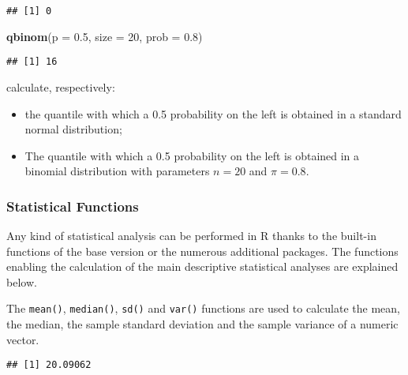 \documentclass[]{book}
\newenvironment{Shaded}{\begin{snugshade}}{\end{snugshade}}
\newcommand{\KeywordTok}[1]{\textcolor[rgb]{0.13,0.29,0.53}{\textbf{{#1}}}}
\newcommand{\DataTypeTok}[1]{\textcolor[rgb]{0.13,0.29,0.53}{{#1}}}
\newcommand{\DecValTok}[1]{\textcolor[rgb]{0.00,0.00,0.81}{{#1}}}
\newcommand{\FloatTok}[1]{\textcolor[rgb]{0.00,0.00,0.81}{{#1}}}
\newcommand{\StringTok}[1]{\textcolor[rgb]{0.31,0.60,0.02}{{#1}}}
\newcommand{\NormalTok}[1]{{#1}}
\providecommand{\tightlist}{%
  \setlength{\itemsep}{0pt}\setlength{\parskip}{0pt}}
\def\tightlist{}
\begin{document}
\begin{verbatim}
## [1] 0
\end{verbatim}

\begin{Shaded}
\begin{Highlighting}[]
\KeywordTok{qbinom}\NormalTok{(}\DataTypeTok{p =} \FloatTok{0.5}\NormalTok{, }\DataTypeTok{size =} \DecValTok{20}\NormalTok{, }\DataTypeTok{prob =} \FloatTok{0.8}\NormalTok{)}
\end{Highlighting}
\end{Shaded}

\begin{verbatim}
## [1] 16
\end{verbatim}

calculate, respectively:

\begin{itemize}
\tightlist
\item
  the quantile with which a 0.5 probability on the left is obtained in a
  standard normal distribution;
\item
  The quantile with which a 0.5 probability on the left is obtained in a
  binomial distribution with parameters \(n = 20\) and \(\pi = 0.8\).
\end{itemize}

\subsubsection{Statistical Functions}\label{statistical-functions}

Any kind of statistical analysis can be performed in R thanks to the
built-in functions of the base version or the numerous additional
packages. The functions enabling the calculation of the main descriptive
statistical analyses are explained below.

The \texttt{mean()}, \texttt{median()}, \texttt{sd()} and \texttt{var()}
functions are used to calculate the mean, the median, the sample
standard deviation and the sample variance of a numeric vector.

\begin{Shaded}
\end{Shaded}

\begin{verbatim}
## [1] 20.09062
\end{verbatim}
\end{document}

